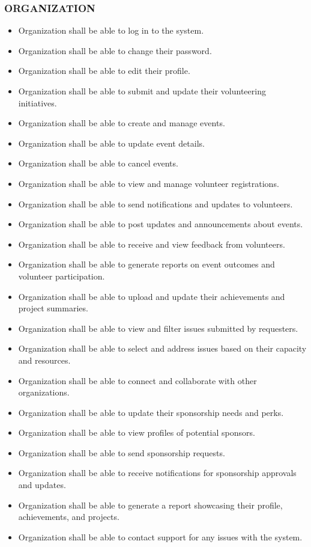 \subsubsection*{ORGANIZATION}
\begin{itemize}
\itemsep0em 
    \item Organization shall be able to log in to the system.
    \item Organization shall be able to change their password.
    \item Organization shall be able to edit their profile.
    \item Organization shall be able to submit and update their volunteering initiatives.
    \item Organization shall be able to create and manage events.
    \item Organization shall be able to update event details.
    \item Organization shall be able to cancel events.
    \item Organization shall be able to view and manage volunteer registrations.
    \item Organization shall be able to send notifications and updates to volunteers.
    \item Organization shall be able to post updates and announcements about events.
    \item Organization shall be able to receive and view feedback from volunteers.
    \item Organization shall be able to generate reports on event outcomes and volunteer participation.
    \item Organization shall be able to upload and update their achievements and project summaries.
    \item Organization shall be able to view and filter issues submitted by requesters.
    \item Organization shall be able to select and address issues based on their capacity and resources.
    \item Organization shall be able to connect and collaborate with other organizations.
    \item Organization shall be able to update their sponsorship needs and perks.
    \item Organization shall be able to view profiles of potential sponsors.
    \item Organization shall be able to send sponsorship requests.
    \item Organization shall be able to receive notifications for sponsorship approvals and updates.
    \item Organization shall be able to generate a report showcasing their profile, achievements, and projects.
    \item Organization shall be able to contact support for any issues with the system.
\end{itemize}

